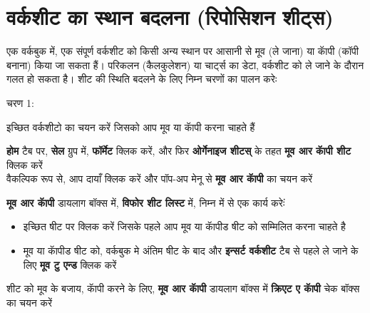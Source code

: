 \section{वर्कशीट का स्थान बदलना (रिपोसिशन शीट्स)}\label{id-1.7}

एक वर्कबुक में, एक संपूर्ण वर्कशीट को किसी अन्य स्थान पर आसानी से मूव (ले जाना) या कॅापी (कॉपी बनाना) किया जा सकता हैं। परिकलन (कैलकुलेशन) या चार्ट्स का डेटा, वर्कशीट को ले जाने के दौरान गलत हो सकता है। शीट की स्थिति बदलने के लिए निम्न चरणों का पालन करेः
\begin{descriptionSimple}{चरण 1:}
\item[चरण 1] इच्छित वर्कशीटो का चयन करें जिसको आप मूव या कॅापी करना चाहते हैं
\item[चरण 2] \textbf{होम} टैब पर, \textbf{सेल} ग्रुप में, \textbf{फॉर्मेट} क्लिक करें, और फिर \textbf{ओर्गेनाइज शीटस्} के तहत \textbf{मूव आर कॅापी शीट} क्लिक करें\\  वैकल्पिक रूप से, आप दायाँ क्लिक करें और पॉप-अप मेनू से \textbf{मूव आर कॅापी} का चयन करें
\item[चरण 3] \textbf{मूव आर कॅापी} डायलाग बॉक्स में, \textbf{विफोर शीट लिस्ट} में, निम्न में से एक कार्य करेःं
	\begin{itemize}[topsep=0.2ex,parsep=0ex,partopsep=0ex,itemsep=0ex]
		\item इच्छित षीट पर क्लिक करें जिसके पहले आप मूव या कॅापीड षीट को सम्मिलित करना चाहते है
		\item मूव या कॅापीड षीट को, वर्कबुक मे अंतिम षीट के बाद और \textbf{इन्सर्ट वर्कशीट} टैब से पहले ले जाने के लिए \textbf{मूव टु एन्ड} क्लिक करें
	\end{itemize}
\item[चरण 4] शीट को मूव के बजाय, कॅापी करने के लिए, \textbf{मूव आर कॅापी} डायलाग बॉक्स में \textbf{क्रिएट ए कॅापी} चेक बॉक्स का चयन करें
\end{descriptionSimple}

